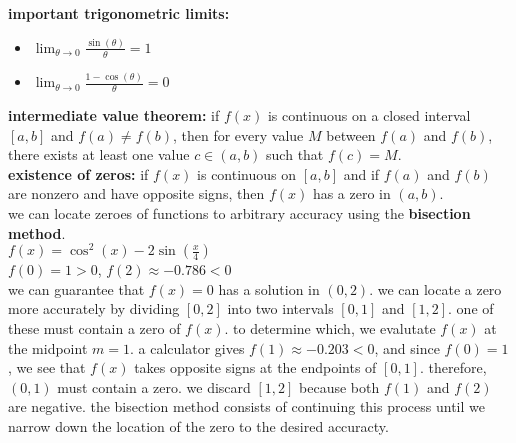 \documentclass{article}
\begin{document}
\textbf{important trigonometric limits:}
	\begin{itemize}
		\item $\lim_{\theta \to 0}\frac{\sin(\theta)}{\theta} = 1$
		\item $\lim_{\theta \to 0}\frac{1 - \cos(\theta)}{\theta} = 0$
	\end{itemize}

\textbf{intermediate value theorem:} if $f(x)$ is continuous on a closed interval $[a, b]$ and $f(a) \neq f(b)$, then for every value $M$ between $f(a)$ and $f(b)$, there exists at least one value $c \in (a, b)$ such that $f(c) = M$.\\

\textbf{existence of zeros:} if $f(x)$ is continuous on $[a, b]$ and if $f(a)$ and $f(b)$ are nonzero and have opposite signs, then $f(x)$ has a zero in $(a, b)$.\\

we can locate zeroes of functions to arbitrary accuracy using the \textbf{bisection method}.\\
$f(x) = \cos^2(x) - 2\sin(\frac{x}{4})$\\
$f(0) = 1 > 0$, $f(2) \approx -0.786 < 0$\\
we can guarantee that $f(x) = 0$ has a solution in $(0, 2)$. we can locate a zero more accurately by dividing $[0, 2]$ into two intervals $[0, 1]$ and $[1, 2]$. one of these must contain a zero of $f(x)$. to determine which, we evalutate $f(x)$ at the midpoint $m = 1$. a calculator gives $f(1) \approx -0.203 < 0$, and since $f(0) = 1$, we see that $f(x)$ takes opposite signs at the endpoints of $[0, 1]$. therefore, $(0, 1)$ must contain a zero. we discard $[1, 2]$ because both $f(1)$ and $f(2)$ are negative. the bisection method consists of continuing this process until we narrow down the location of the zero to the desired accuracty.\\
\end{document}
